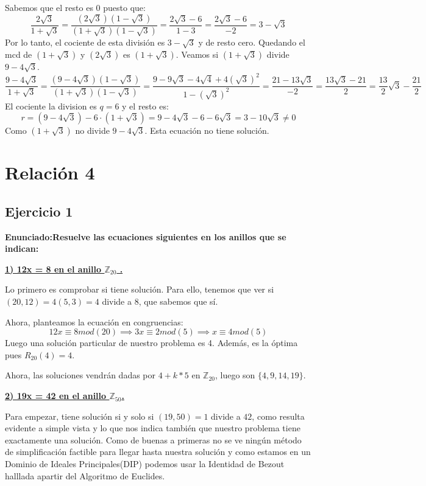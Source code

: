 \documentclass[11pt, a4paper, titlepage]{article}
\providecommand{\ent}{\mathbb{Z}}
\begin{document}
Sabemos que el resto es 0 puesto que:\\
$$ \frac{2 \sqrt3}{1 + \sqrt3} = \frac{(2\sqrt3)(1 - \sqrt3)}{(1 + \sqrt3)(1 - \sqrt3)} = \frac{2 \sqrt3 - 6}{1 - 3} = \frac{2\sqrt3 - 6}{-2} = 3 - \sqrt3 $$
Por lo tanto, el cociente de esta división es $ 3 - \sqrt3 $ y de resto cero. Quedando el mcd de $(1 + \sqrt 3)$ y $(2\sqrt3)$ es $(1 + \sqrt 3)$. Veamos si $(1 + \sqrt 3)$ divide $ 9 -4 \sqrt3$.\\
$$ \frac{9 - 4\sqrt3}{1 + \sqrt3} = \frac{(9 - 4\sqrt3)(1 - \sqrt3)}{(1 + \sqrt3)(1 - \sqrt3)} = \frac{9 - 9\sqrt3 - 4\sqrt4 + 4{(\sqrt3)}^{2}}{1 - {(\sqrt3)}^{2} } = \frac{21 -13\sqrt3}{-2} = \frac{13\sqrt3 - 21}{2} = \frac{13}{2}\sqrt3 - \frac{21}{2}$$
El cociente la division es $q = 6$ y el resto es: \\
$$r = (9 -4\sqrt3) - 6 \cdot (1 + \sqrt3) = 9 -4\sqrt3 - 6 -6\sqrt3 = 3 - 10\sqrt{3} \neq 0$$ 
Como $(1 + \sqrt 3)$ no divide $ 9 -4 \sqrt3$. Esta ecuación no tiene solución.




\pagebreak
\section{\Huge{Relación 4}}



\subsection{ \LARGE{Ejercicio 1}}

\textbf{Enunciado:Resuelve las ecuaciones siguientes en los anillos que se indican:}

\underline{\textbf{1) 12x = 8 en el anillo $\ent_{20}$ .}}

Lo primero es comprobar si tiene solución. Para ello, tenemos que ver si $(20,12) = 4(5,3) = 4$ divide a 8, que sabemos que sí.

Ahora, planteamos la ecuación en congruencias:
	\[
	12x \equiv 8 mod(20) \implies 3x \equiv 2 mod(5) \implies x \equiv 4 mod(5)
	\]
Luego una solución particular de nuestro problema es 4. Además, es la óptima pues $R_{20}(4) = 4$.

Ahora, las soluciones vendrán dadas por $4+k*5$ en $\ent_{20}$, luego son $\{4,9,14,19\}$.

\underline{\textbf{2) 19x = 42 en el anillo $\ent_{50}$.}}

Para empezar, tiene solución si y solo si $(19,50)=1$ divide a $42$, como resulta evidente a simple vista y lo que nos indica también que nuestro problema tiene exactamente una solución. Como de buenas a primeras no se ve ningún método de simplificación factible para llegar hasta nuestra solución y como estamos en un Dominio de Ideales Principales(DIP) podemos usar la Identidad de Bezout halllada apartir del Algoritmo de Euclides.
\end{document}
